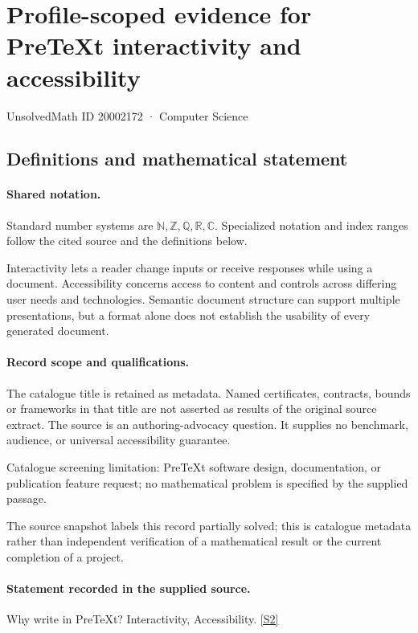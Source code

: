 \documentclass[11pt]{article}
\newcommand{\sref}[2]{\hyperlink{source:#1:#2}{[S#2]}}
\begin{document}
\setcounter{section}{20002171}
\section{Profile-scoped evidence for PreTeXt interactivity and accessibility}\label{20002172}
{\small\sffamily UnsolvedMath ID 20002172 · Computer Science}
\subsection{Definitions and mathematical statement}

\paragraph{Shared notation.}Standard number systems are $\mathbb N,\mathbb Z,\mathbb Q,\mathbb R,\mathbb C$. Specialized notation and index ranges follow the cited source and the definitions below.


Interactivity lets a reader change inputs or receive responses while using a document. Accessibility concerns access to content and controls across differing user needs and technologies. Semantic document structure can support multiple presentations, but a format alone does not establish the usability of every generated document.
\paragraph{Record scope and qualifications.}
The catalogue title is retained as metadata. Named certificates, contracts, bounds or frameworks in that title are not asserted as results of the original source extract.
The source is an authoring-advocacy question. It supplies no benchmark, audience, or universal accessibility guarantee.

Catalogue screening limitation: PreTeXt software design, documentation, or publication feature request; no mathematical problem is specified by the supplied passage.

The source snapshot labels this record partially solved; this is catalogue metadata rather than independent verification of a mathematical result or the current completion of a project.
\paragraph{Statement recorded in the supplied source.}
Why write in PreTeXt? Interactivity, Accessibility. \sref{20002172}{2}
\end{document}
